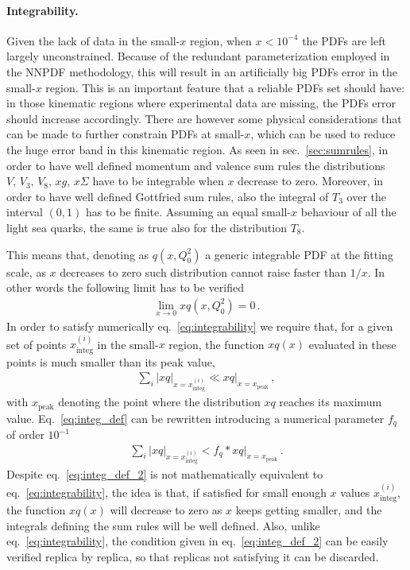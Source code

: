 \paragraph{Integrability.}
Given the lack of data in the small-$x$ region, when $x<10^{-4}$ the PDFs are left largely unconstrained. 
Because of the redundant parameterization employed in the NNPDF methodology, this will result in 
an artificially big PDFs error in the small-$x$ region.
This is an important feature that a reliable PDFs set should have: in those kinematic regions where experimental data
are missing, the PDFs error should increase accordingly.
There are however some physical considerations that can be made to further constrain PDFs at small-$x$, 
which can be used to reduce the huge error band in this kinematic region. 
As seen in sec.~\ref{sec:sumrules}, in order to have well defined momentum and valence sum rules
the distributions $V,\, V_3,\, V_8,\, xg,\, x\Sigma$ have to be integrable when $x$ decrease to zero.
Moreover, in order to have well defined Gottfried sum rules, also the integral of $T_3$ over the interval
$\left(0,1\right)$ has to be finite. 
Assuming an equal small-$x$ behaviour of all the light sea quarks, the same is true also for the distribution $T_8$.

This means that, denoting as $q\left(x,Q_0^2\right)$ a generic integrable PDF at the fitting scale, as $x$ decreases to zero
such distribution cannot raise faster than $1/x$. In other words the following limit has to be verified
\begin{align}
    \label{eq:integrability}
    \lim_{x\rightarrow 0} xq\left(x,Q_0^2\right) = 0\,.
\end{align}
%
In order to satisfy numerically eq.~\eqref{eq:integrability}
we require that, for a given set of points $x^{(i)}_{\text{integ}}$ in the small-$x$ region,
the function $xq\left(x\right)$ evaluated in these points is much smaller than its peak value,
\begin{align}
    \label{eq:integ_def}
    \sum_i|xq|_{x=x^{(i)}_{\text{integ}}} \ll xq|_{x=x_{\text{peak}}}\,,
\end{align}
with $x_{\text{peak}}$ denoting the point where the distribution $xq$ reaches its maximum value.
Eq.~\eqref{eq:integ_def} can be rewritten introducing a numerical parameter $f_q$ of order $10^{-1}$
\begin{align}
    \label{eq:integ_def_2}
    \sum_i|xq|_{x=x^{(i)}_{\text{integ}}} < f_q*xq|_{x=x_{\text{peak}}}\,.
\end{align}
Despite eq.~\eqref{eq:integ_def_2} is not mathematically equivalent to eq.~\eqref{eq:integrability},
 the idea is that,
if satisfied for small enough $x$ values $x^{(i)}_{\text{integ}}$, the function $xq\left(x\right)$ will 
decrease to zero as $x$ keeps getting smaller, and the integrals defining the sum rules will be 
well defined. Also, unlike eq.~\eqref{eq:integrability}, the condition given
in eq.~\eqref{eq:integ_def_2} can be easily verified replica by replica, so that replicas not satisfying it
can be discarded.

